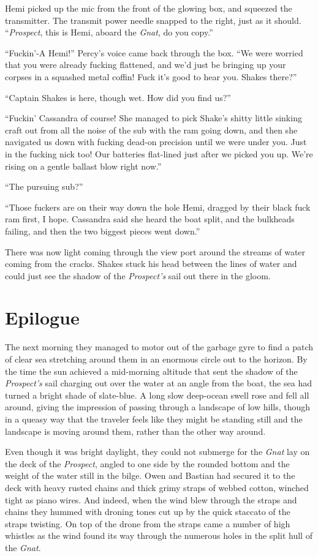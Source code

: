 \documentclass[]{scrbook}
\begin{document}
Hemi picked up the mic from the front of the glowing box, and squeezed
the transmitter. The transmit power needle snapped to the right, just as
it should. ``\emph{Prospect}, this is Hemi, aboard the \emph{Gnat}, do
you copy.''

``Fuckin'-A Hemi!'' Percy's voice came back through the box. ``We were
worried that you were already fucking flattened, and we'd just be
bringing up your corpses in a squashed metal coffin! Fuck it's good to
hear you. Shakes there?''

``Captain Shakes is here, though wet. How did you find us?''

``Fuckin' Cassandra of course! She managed to pick Shake's shitty little
sinking craft out from all the noise of the sub with the ram going down,
and then she navigated us down with fucking dead-on precision until we
were under you. Just in the fucking nick too! Our batteries flat-lined
just after we picked you up. We're rising on a gentle ballast blow right
now.''

``The pursuing sub?''

``Those fuckers are on their way down the hole Hemi, dragged by their
black fuck ram first, I hope. Cassandra said she heard the boat split,
and the bulkheads failing, and then the two biggest pieces went down.''

There was now light coming through the view port around the streams of
water coming from the cracks. Shakes stuck his head between the lines of
water and could just see the shadow of the \emph{Prospect's} sail out
there in the gloom.

\hypertarget{epilogue}{%
\chapter*{Epilogue}\label{epilogue}}

The next morning they managed to motor out of the garbage gyre to find a
patch of clear sea stretching around them in an enormous circle out to
the horizon. By the time the sun achieved a mid-morning altitude that
sent the shadow of the \emph{Prospect's} sail charging out over the
water at an angle from the boat, the sea had turned a bright shade of
slate-blue. A long slow deep-ocean swell rose and fell all around,
giving the impression of passing through a landscape of low hills,
though in a queasy way that the traveler feels like they might be
standing still and the landscape is moving around them, rather than the
other way around.

Even though it was bright daylight, they could not submerge for the
\emph{Gnat} lay on the deck of the \emph{Prospect}, angled to one side
by the rounded bottom and the weight of the water still in the bilge.
Owen and Bastian had secured it to the deck with heavy rusted chains and
thick grimy straps of webbed cotton, winched tight as piano wires. And
indeed, when the wind blew through the straps and chains they hummed
with droning tones cut up by the quick staccato of the straps twisting.
On top of the drone from the straps came a number of high whistles as
the wind found its way through the numerous holes in the split hull of
the \emph{Gnat}.
\end{document}
